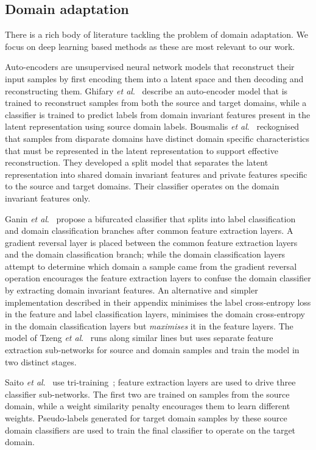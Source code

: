 \documentclass{article}
\newcommand{\etal}{\textit{et al}.}
\begin{document}
\subsection{Domain adaptation}
\label{sec:related:domadapt}

There is a rich body of literature tackling the problem of domain adaptation. We focus on deep learning based methods as these are most relevant to our work.

Auto-encoders are unsupervised neural network models that reconstruct their input samples by first encoding them into a latent space and then decoding and reconstructing them. Ghifary \etal~\cite{Ghifary:DomainAdaptRecons} describe an auto-encoder model that is trained to reconstruct samples from both the source and target domains, while a classifier is trained to predict labels from domain invariant features present in the latent representation using source domain labels. Bousmalis \etal~\cite{Bousmalis:DSN} reckognised that samples from disparate domains have distinct domain specific characteristics that must be represented in the latent representation to support effective reconstruction. They developed a split model that separates the latent representation into shared domain invariant features and private features specific to the source and target domains. Their classifier operates on the domain invariant features only.

Ganin \etal~\cite{Ganin:DomainAdaptBackprop} propose a bifurcated classifier that splits into label classification and domain classification branches after common feature extraction layers. A gradient reversal layer is placed between the common feature extraction layers and the domain classification branch; while the domain classification layers attempt to determine which domain a sample came from the gradient reversal operation encourages the feature extraction layers to confuse the domain classifier by extracting domain invariant features. An alternative and simpler implementation described in their appendix minimises the label cross-entropy loss in the feature and label classification layers, minimises the domain cross-entropy in the domain classification layers but \emph{maximises} it in the feature layers. The model of Tzeng \etal~\cite{Tzeng:AdvDiscDomAdapt} runs along similar lines but uses separate feature extraction sub-networks for source and domain samples and train the model in two distinct stages.

Saito \etal~\cite{Saito:AsymTriDomAdapt} use tri-training~\cite{Zhou:TriTraining}; feature extraction layers are used to drive three classifier sub-networks. The first two are trained on samples from the source domain, while a weight similarity penalty encourages them to learn different weights. Pseudo-labels generated for target domain samples by these source domain classifiers are used to train the final classifier to operate on the target domain.
\end{document}
